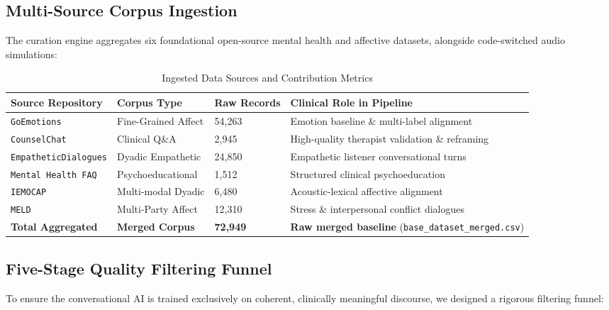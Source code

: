\documentclass[11pt,a4paper]{article}
\begin{document}
\subsection{Multi-Source Corpus Ingestion}
The curation engine aggregates six foundational open-source mental health and affective datasets, alongside code-switched audio simulations:

\begin{table}[H]
\centering
\small
\sffamily
\caption{Ingested Data Sources and Contribution Metrics}
\label{tab:source_stats}
\begin{tabularx}{\linewidth}{p{3.5cm}p{3cm}p{2.2cm}X}
\toprule
\textbf{Source Repository} & \textbf{Corpus Type} & \textbf{Raw Records} & \textbf{Clinical Role in Pipeline} \\
\midrule
\texttt{GoEmotions} & Fine-Grained Affect & 54,263 & Emotion baseline \& multi-label alignment \\
\texttt{CounselChat} & Clinical Q\&A & 2,945 & High-quality therapist validation \& reframing \\
\texttt{EmpatheticDialogues} & Dyadic Empathetic & 24,850 & Empathetic listener conversational turns \\
\texttt{Mental Health FAQ} & Psychoeducational & 1,512 & Structured clinical psychoeducation \\
\texttt{IEMOCAP} & Multi-modal Dyadic & 6,480 & Acoustic-lexical affective alignment \\
\texttt{MELD} & Multi-Party Affect & 12,310 & Stress \& interpersonal conflict dialogues \\
\midrule
\textbf{Total Aggregated} & \textbf{Merged Corpus} & \textbf{72,949} & \textbf{Raw merged baseline} (\texttt{base\_dataset\_merged.csv}) \\
\bottomrule
\end{tabularx}
\end{table}

\subsection{Five-Stage Quality Filtering Funnel}
To ensure the conversational AI is trained exclusively on coherent, clinically meaningful discourse, we designed a rigorous filtering funnel:
\end{document}
